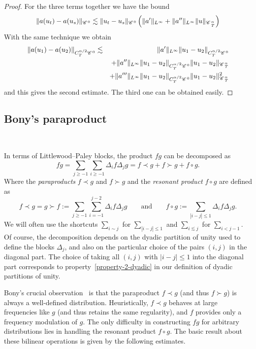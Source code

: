 \documentclass[11pt,reqno]{amsart}
\newcommand{\assign}{:=}
\newcommand{\tmtextit}[1]{{\itshape{#1}}}
\newcommand{\CC}{\mathscr{C} \hspace{.1em}}
\begin{document}
\begin{proof}
  
  For the three terms together we have the bound
  \[ \| a (u_t) - a (u_s) \|_{\CC^0} \lesssim \| u_t - u_s \|_{\CC^0} \left(
     \| a' \|_{L^{\infty}} + \| a'' \|_{L^{\infty}} \| u
     \|_{\CC^{\alpha}_{_T}} \right) \]
  With the same technique we obtain
  \begin{eqnarray*}
    \| a (u_1) - a (u_2) \|_{C_T^{\alpha / 2} \CC^0} & \lesssim & \| a'
    \|_{L^{\infty}} \| u_1 - u_2 \|_{C_T^{\alpha / 2} \CC^0}\\
    &  & + \| a'' \|_{L^{\infty}} \| u_1 - u_2 \|_{C_T^{\alpha / 2} \CC^0} \|
    u_1 - u_2 \|_{\CC^{\alpha}_T}\\
    &  & + \| a''' \|_{L^{\infty}} \| u_1 - u_2 \|_{C_T^{\alpha / 2} \CC^0}
    \| u_1 - u_2 \|^2_{\CC^{\alpha}_T}
  \end{eqnarray*}
  and this gives the second estimate. The third one can be obtained easily.
\end{proof}

\subsection{Bony's paraproduct}\label{ssec:bony}

\

In terms of Littlewood--Paley blocks, the product $fg$ can be decomposed as
\[ fg = \sum_{j \geqslant - 1} \sum_{i \geqslant - 1} \Delta_i f \Delta_j g =
   f \prec g + f \succ g + f \circ g. \]
Where the \tmtextit{paraproducts} $f \prec g$ and $f \succ g$ and the
\tmtextit{resonant product} $f \circ g$ are defined as
\[ f \prec g = g \succ f \assign \sum_{j \geqslant - 1} \sum_{i = - 1}^{j - 2}
   \Delta_i f \Delta_j g \qquad \text{and} \qquad f \circ g \assign \sum_{|i -
   j| \leqslant 1} \Delta_i f \Delta_j g. \]
We will often use the shortcuts $\sum_{i \sim j}$ for $\sum_{| i - j |
\leqslant 1}$ and $\sum_{i \lesssim j}$ for $\sum_{i < j - 1}$. Of course, the
decomposition depends on the dyadic partition of unity used to define the
blocks $\Delta_j$, and also on the particular choice of the pairs $(i, j)$ in
the diagonal part. The choice of taking all $(i, j)$ with $|i - j| \leqslant
1$ into the diagonal part corresponds to property~\ref{property-2-dyadic} in
our definition of dyadic partitions of unity.

Bony's crucial observation~{\cite{Bony1981,meyer_remarques_1981}} is that the
paraproduct $f \prec g$ (and thus $f \succ g$) is always a well-defined
distribution. Heuristically, $f \prec g$ behaves at large frequencies like $g$
(and thus retains the same regularity), and $f$ provides only a frequency
modulation of $g$. The only difficulty in constructing $fg$ for arbitrary
distributions lies in handling the resonant product $f \circ g$. The basic
result about these bilinear operations is given by the following estimates.
\end{document}
